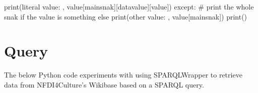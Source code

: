 \documentclass[
  letterpaper,
  DIV=11,
  numbers=noendperiod]{scrreprt}
\newenvironment{Shaded}{\begin{snugshade}}{\end{snugshade}}
\newcommand{\BuiltInTok}[1]{\textcolor[rgb]{0.00,0.23,0.31}{#1}}
\newcommand{\CommentTok}[1]{\textcolor[rgb]{0.37,0.37,0.37}{#1}}
\newcommand{\ControlFlowTok}[1]{\textcolor[rgb]{0.00,0.23,0.31}{#1}}
\newcommand{\NormalTok}[1]{\textcolor[rgb]{0.00,0.23,0.31}{#1}}
\newcommand{\StringTok}[1]{\textcolor[rgb]{0.13,0.47,0.30}{#1}}
\begin{document}
\begin{Shaded}
\begin{Highlighting}[]
                \BuiltInTok{print}\NormalTok{(}\StringTok{\textquotesingle{}literal value: \textquotesingle{}}\NormalTok{, value[}\StringTok{\textquotesingle{}mainsnak\textquotesingle{}}\NormalTok{][}\StringTok{\textquotesingle{}datavalue\textquotesingle{}}\NormalTok{][}\StringTok{\textquotesingle{}value\textquotesingle{}}\NormalTok{])}
            \ControlFlowTok{except}\NormalTok{:}
                \CommentTok{\# print the whole snak if the value is something else}
                \BuiltInTok{print}\NormalTok{(}\StringTok{\textquotesingle{}other value: \textquotesingle{}}\NormalTok{, value[}\StringTok{\textquotesingle{}mainsnak\textquotesingle{}}\NormalTok{])}
    \BuiltInTok{print}\NormalTok{()}
\end{Highlighting}
\end{Shaded}

\hypertarget{query}{%
\section{Query}\label{query}}

The below Python code experiments with using SPARQLWrapper to retrieve
data from NFDI4Culture's Wikibase based on a SPARQL query.
\end{document}
